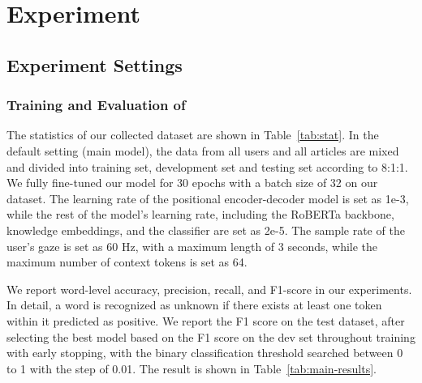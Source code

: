 \section{Experiment}
\label{sec:experiment}


\subsection{Experiment Settings}
\subsubsection{Training and Evaluation of \name{}}
The statistics of our collected dataset are shown in Table~\ref{tab:stat}. In the default setting (main model), the data from all users and all articles are mixed and divided into training set, development set and testing set according to 8:1:1. We fully fine-tuned our model for 30 epochs with a batch size of 32 on our dataset. The learning rate of the positional encoder-decoder model is set as 1e-3, while the rest of the model's learning rate, including the RoBERTa backbone, knowledge embeddings, and the classifier are set as 2e-5. The sample rate of the user's gaze is set as 60 Hz, with a maximum length of 3 seconds, while the maximum number of context tokens is set as 64. 



We report word-level accuracy, precision, recall, and F1-score in our experiments. In detail, a word is recognized as unknown if there exists at least one token within it predicted as positive. We report the F1 score on the test dataset, after selecting the best model based on the F1 score on the dev set throughout training with early stopping, with the binary classification threshold searched between 0 to 1 with the step of 0.01. The result is shown in Table~\ref{tab:main-results}.

